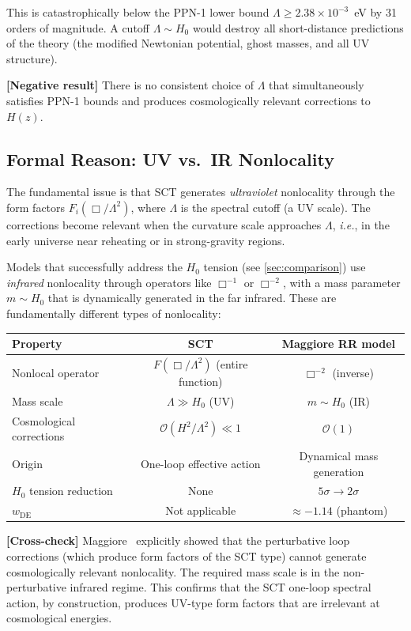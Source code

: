 \documentclass[11pt,a4paper]{article}
\theoremstyle{plain}
\theoremstyle{definition}
\theoremstyle{remark}
\newcommand{\ie}{\textit{i.e.}}
\newcommand{\crosscheck}[1]{%
  \par\smallskip\noindent
  \colorbox{blue!10}{\parbox{\dimexpr\linewidth-2\fboxsep}{%
    \textcolor{blue!50!black}{\textbf{[Cross-check]}} #1}}%
  \par\smallskip}
\newcommand{\negativeresult}[1]{%
  \par\smallskip\noindent
  \colorbox{orange!10}{\parbox{\dimexpr\linewidth-2\fboxsep}{%
    \textcolor{orange!60!black}{\textbf{[Negative result]}} #1}}%
  \par\smallskip}
\begin{document}
This is catastrophically below the PPN-1 lower bound
$\Lambda \geq 2.38 \times 10^{-3}$~eV by 31 orders of magnitude.
A cutoff $\Lambda \sim H_0$ would destroy all short-distance
predictions of the theory (the modified Newtonian potential, ghost
masses, and all UV structure).

\negativeresult{There is no consistent choice of $\Lambda$ that
simultaneously satisfies PPN-1 bounds and produces cosmologically
relevant corrections to $H(z)$.}

\subsection{Formal Reason: UV vs.\ IR Nonlocality}

The fundamental issue is that SCT generates \emph{ultraviolet}
nonlocality through the form factors $F_i(\Box/\Lambda^2)$, where
$\Lambda$ is the spectral cutoff (a UV scale). The corrections become
relevant when the curvature scale approaches $\Lambda$, \ie, in the
early universe near reheating or in strong-gravity regions.

Models that successfully address the $H_0$ tension (see
\cref{sec:comparison}) use \emph{infrared} nonlocality through
operators like $\Box^{-1}$ or $\Box^{-2}$, with a mass parameter
$m \sim H_0$ that is dynamically generated in the far infrared. These
are fundamentally different types of nonlocality:

\begin{center}
\begin{tabular}{lcc}
\toprule
\textbf{Property} & \textbf{SCT} & \textbf{Maggiore RR model} \\
\midrule
Nonlocal operator & $F(\Box/\Lambda^2)$ (entire function) & $\Box^{-2}$ (inverse) \\
Mass scale & $\Lambda \gg H_0$ (UV) & $m \sim H_0$ (IR) \\
Cosmological corrections & $\mathcal{O}(H^2/\Lambda^2) \ll 1$ & $\mathcal{O}(1)$ \\
Origin & One-loop effective action & Dynamical mass generation \\
$H_0$ tension reduction & None & $5\sigma \to 2\sigma$ \\
$w_{\mathrm{DE}}$ & Not applicable & $\approx -1.14$ (phantom) \\
\bottomrule
\end{tabular}
\end{center}

\crosscheck{Maggiore~\cite{Maggiore16} explicitly showed that the
perturbative loop corrections (which produce form factors of the SCT
type) cannot generate cosmologically relevant nonlocality. The
required mass scale is in the non-perturbative infrared regime. This
confirms that the SCT one-loop spectral action, by construction,
produces UV-type form factors that are irrelevant at cosmological
energies.}
\end{document}
